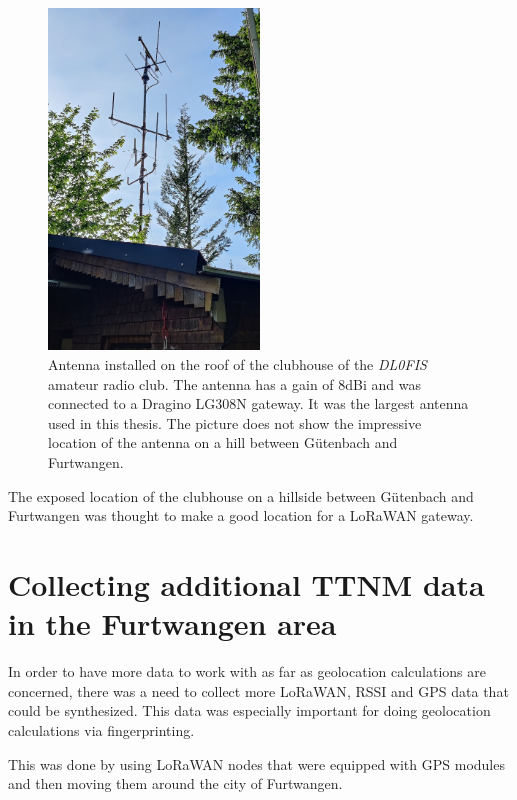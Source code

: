 \begin{figure}[htbp]
    \centering
    \includegraphics[width=0.5\textwidth]{pictures/hardware/gateway-deployment/gateway_dl0fis_clubhouse.jpg}
    \caption{
        Antenna installed on the roof of the clubhouse of the \emph{DL0FIS} amateur radio club.
        The antenna has a gain of 8dBi and was connected to a Dragino LG308N gateway.
        It was the largest antenna used in this thesis.
        The picture does not show the impressive location of the antenna on a hill between Gütenbach and Furtwangen.
    }\label{pic:antenna-dl0fis-clubhouse}
\end{figure}

The exposed location of the clubhouse on a hillside between Gütenbach and Furtwangen was thought to make a good location for a \ac{LoRaWAN} gateway.

\section{Collecting additional \acf{TTNM} data in the Furtwangen area}\label{sec:collecting-additional-ttnm-data}

In order to have more data to work with as far as geolocation calculations are concerned, there was a need to collect more \ac{LoRaWAN}, \ac{RSSI} and \ac{GPS} data that could be synthesized.
This data was especially important for doing geolocation calculations via fingerprinting.

This was done by using \ac{LoRaWAN} nodes that were equipped with \ac{GPS} modules and then moving them around the city of Furtwangen.

